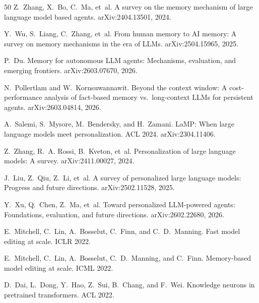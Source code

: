 \documentclass[11pt]{article}
\begin{document}
\begin{thebibliography}{50}
Z.~Zhang, X.~Bo, C.~Ma, et~al.
\newblock A survey on the memory mechanism of large language model based agents.
\newblock arXiv:2404.13501, 2024.

Y.~Wu, S.~Liang, C.~Zhang, et~al.
\newblock From human memory to AI memory: A survey on memory mechanisms in the era of LLMs.
\newblock arXiv:2504.15965, 2025.

P.~Du.
\newblock Memory for autonomous LLM agents: Mechanisms, evaluation, and emerging frontiers.
\newblock arXiv:2603.07670, 2026.

N.~Pollertlam and W.~Kornsuwannawit.
\newblock Beyond the context window: A cost-performance analysis of fact-based memory vs.\ long-context LLMs for persistent agents.
\newblock arXiv:2603.04814, 2026.

A.~Salemi, S.~Mysore, M.~Bendersky, and H.~Zamani.
\newblock LaMP: When large language models meet personalization.
\newblock ACL 2024. arXiv:2304.11406.

Z.~Zhang, R.~A. Rossi, B.~Kveton, et~al.
\newblock Personalization of large language models: A survey.
\newblock arXiv:2411.00027, 2024.

J.~Liu, Z.~Qiu, Z.~Li, et~al.
\newblock A survey of personalized large language models: Progress and future directions.
\newblock arXiv:2502.11528, 2025.

Y.~Xu, Q.~Chen, Z.~Ma, et~al.
\newblock Toward personalized LLM-powered agents: Foundations, evaluation, and future directions.
\newblock arXiv:2602.22680, 2026.

E.~Mitchell, C.~Lin, A.~Bosselut, C.~Finn, and C.~D.~Manning.
\newblock Fast model editing at scale.
\newblock ICLR 2022.

E.~Mitchell, C.~Lin, A.~Bosselut, C.~D.~Manning, and C.~Finn.
\newblock Memory-based model editing at scale.
\newblock ICML 2022.

D.~Dai, L.~Dong, Y.~Hao, Z.~Sui, B.~Chang, and F.~Wei.
\newblock Knowledge neurons in pretrained transformers.
\newblock ACL 2022.


\end{thebibliography}
\end{document}
